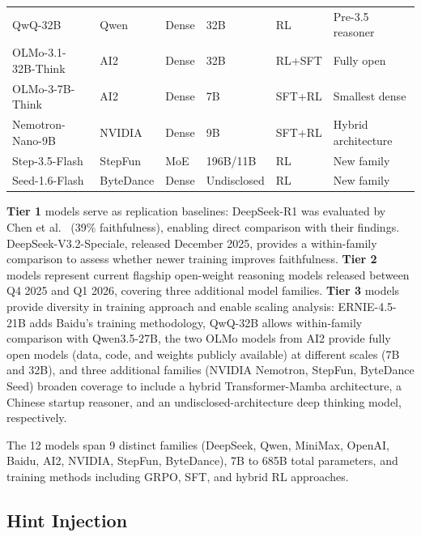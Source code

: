 \begin{table}[H]
\begin{tabular}{llllll}
    QwQ-32B                  & Qwen      & Dense & 32B        & RL          & Pre-3.5 reasoner \\
    OLMo-3.1-32B-Think       & AI2       & Dense & 32B        & RL+SFT      & Fully open \\
    OLMo-3-7B-Think          & AI2       & Dense & 7B         & SFT+RL      & Smallest dense \\
    Nemotron-Nano-9B          & NVIDIA    & Dense & 9B         & SFT+RL      & Hybrid architecture \\
    Step-3.5-Flash           & StepFun   & MoE   & 196B/11B   & RL          & New family \\
    Seed-1.6-Flash           & ByteDance & Dense & Undisclosed & RL          & New family \\
    \bottomrule
  \end{tabular}
\end{table}

\noindent \textbf{Tier 1} models serve as replication baselines: DeepSeek-R1 was
evaluated by Chen et al.~\cite{chen2025reasoning} (39\% faithfulness), enabling
direct comparison with their findings. DeepSeek-V3.2-Speciale, released December
2025, provides a within-family comparison to assess whether newer training
improves faithfulness.
\textbf{Tier 2} models represent current flagship open-weight reasoning models
released between Q4 2025 and Q1 2026, covering three additional model families.
\textbf{Tier 3} models provide diversity in training approach and enable scaling
analysis: ERNIE-4.5-21B adds Baidu's training methodology, QwQ-32B allows
within-family comparison with Qwen3.5-27B, the two OLMo models from AI2
\cite{groeneveld2024olmo} provide fully open models (data, code, and weights
publicly available) at different scales (7B and 32B), and three additional
families (NVIDIA Nemotron, StepFun, ByteDance Seed) broaden coverage to include
a hybrid Transformer-Mamba architecture, a Chinese startup reasoner, and an
undisclosed-architecture deep thinking model, respectively.

The 12 models span 9 distinct families (DeepSeek, Qwen,
MiniMax, OpenAI, Baidu, AI2, NVIDIA, StepFun, ByteDance), 7B to 685B total
parameters, and training methods including GRPO, SFT, and hybrid RL
approaches.

\subsection{Hint Injection}
\label{sec:hints}

